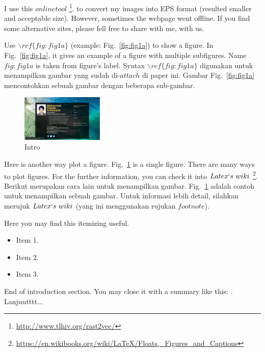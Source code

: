 \documentclass[journal]{IEEEtran}
\begin{document}
I use this $online tool$ \footnote{\label{note:eps_converter1}\url{http://www.tlhiv.org/rast2vec/}}. to convert my images into EPS format (resulted smaller and acceptable size). However, sometimes the webpage went offline. If you find some alternative sites, please fell free to share with me, with us.

Use $\backslash ref\{fig:fig1a\}$ (example: Fig.~\ref{fig:fig1a}) to show a figure. In Fig.~\ref{fig:fig1a}, it gives an example of a figure with multiple subfigures. Name $fig:fig1a$ is taken from figure's label. Syntax $\backslash ref\{fig:fig1a\}$ digunakan untuk menampilkan gambar yang sudah di-$attach$ di paper ini. Gambar Fig.~\ref{fig:fig1a} mencontohkan sebuah gambar dengan beberapa sub-gambar.

\begin{figure}[H]
\centering
  \includegraphics[width=0.35\textwidth]{intro}
\caption{Intro}
\label{fig:fig2}
\end{figure}

Here is another way plot a figure. Fig.~\ref{fig:fig2} is a single figure. There are many ways to plot figures. For the further information, you can check it into $Latex \lq s~wiki$ \footnote{\label{note:latex_wiki_figures}\url{https://en.wikibooks.org/wiki/LaTeX/Floats,_Figures_and_Captions}}. Berikut merupakan cara lain untuk menampilkan gambar. Fig.~\ref{fig:fig2} adalah contoh untuk menampilkan sebuah gambar. Untuk informasi lebih detail, silahkan merujuk $Latex \lq s~wiki$ \footnotemark[\ref{note:latex_wiki_figures}] (yang ini menggunakan rujukan $footnote$). 

Here you may find this itemizing useful.
\begin{itemize}
  \item Item 1.
  \item Item 2.
  \item Item 3.
\end{itemize}

End of introduction section. You may close it with a summary like this: . Lanjuutttt...
\end{document}

